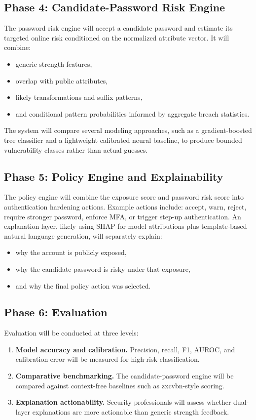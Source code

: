 \documentclass[11pt]{article}
\begin{document}
\subsection{Phase 4: Candidate-Password Risk Engine}
The password risk engine will accept a candidate password and estimate its targeted online risk conditioned on the normalized attribute vector. It will combine:

\begin{itemize}[leftmargin=*]
  \item generic strength features,
  \item overlap with public attributes,
  \item likely transformations and suffix patterns,
  \item and conditional pattern probabilities informed by aggregate breach statistics.
\end{itemize}

The system will compare several modeling approaches, such as a gradient-boosted tree classifier and a lightweight calibrated neural baseline, to produce bounded vulnerability classes rather than actual guesses.

\subsection{Phase 5: Policy Engine and Explainability}
The policy engine will combine the exposure score and password risk score into authentication hardening actions. Example actions include: accept, warn, reject, require stronger password, enforce MFA, or trigger step-up authentication. An explanation layer, likely using SHAP for model attributions plus template-based natural language generation, will separately explain:

\begin{itemize}[leftmargin=*]
  \item why the account is publicly exposed,
  \item why the candidate password is risky under that exposure,
  \item and why the final policy action was selected.
\end{itemize}

\subsection{Phase 6: Evaluation}
Evaluation will be conducted at three levels:

\begin{enumerate}[leftmargin=*]
  \item \textbf{Model accuracy and calibration.} Precision, recall, F1, AUROC, and calibration error will be measured for high-risk classification.
  \item \textbf{Comparative benchmarking.} The candidate-password engine will be compared against context-free baselines such as zxcvbn-style scoring.
  \item \textbf{Explanation actionability.} Security professionals will assess whether dual-layer explanations are more actionable than generic strength feedback.
\end{enumerate}
\end{document}
